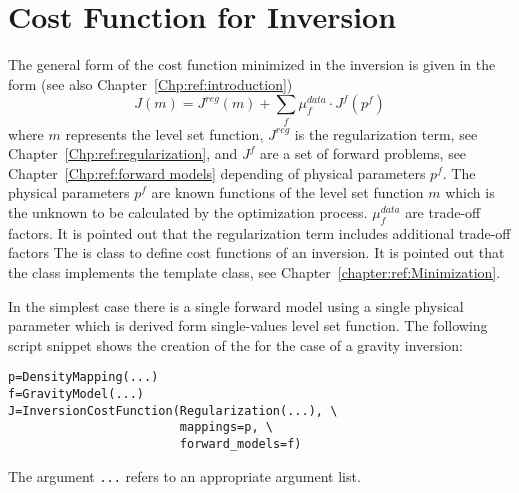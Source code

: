 \section{Cost Function for Inversion}\label{chapter:ref:inversion cost function}
The general form of the cost function minimized in the inversion is given in the form (see also Chapter~\ref{Chp:ref:introduction})
\begin{equation}\label{REF:EQU:DRIVE:10}
J(m) = J^{reg}(m) + \sum_{f} \mu^{data}_{f} \cdot J^{f}(p^f)
\end{equation} 
where $m$ represents the level set function, $J^{reg}$ is the regularization term, see Chapter~\ref{Chp:ref:regularization},
and $J^{f}$ are a set of forward problems, see Chapter~\ref{Chp:ref:forward models} depending of 
physical parameters $p^f$.  The physical parameters $p^f$ are known functions 
of the  level set function $m$ which is the unknown to be calculated by the optimization process. 
$\mu^{data}_{f}$ are trade-off factors. It is pointed out that the regularization term includes additional trade-off factors 
The  is class to define cost functions of an inversion. It is pointed out that
the  class implements the  template class, see Chapter~\ref{chapter:ref:Minimization}.

In the simplest case there is a single forward model using a single physical parameter which is 
derived form single-values level set function. The following script snippet shows the creation of the
 for the case of a gravity inversion:
\begin{verbatim}
p=DensityMapping(...)
f=GravityModel(...)
J=InversionCostFunction(Regularization(...), \
                        mappings=p, \
                        forward_models=f)
\end{verbatim}
The argument \verb|...| refers to an appropriate argument list.

